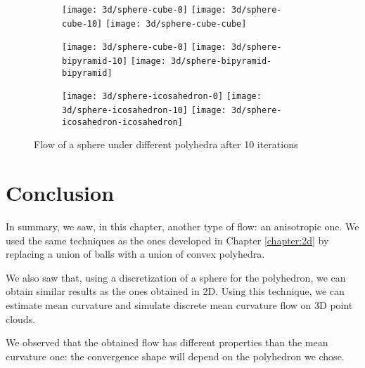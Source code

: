 \begin{figure}[h]
    \centering
    \begin{subfigure}[b]{\textwidth}
        \centering
        \texttt{[image: 3d/sphere-cube-0]}
        \texttt{[image: 3d/sphere-cube-10]}
        \texttt{[image: 3d/sphere-cube-cube]}
    \end{subfigure}

    \begin{subfigure}[b]{\textwidth}
        \centering
        \texttt{[image: 3d/sphere-cube-0]}
        \texttt{[image: 3d/sphere-bipyramid-10]}
        \texttt{[image: 3d/sphere-bipyramid-bipyramid]}
    \end{subfigure}

    \begin{subfigure}[b]{\textwidth}
        \centering
        \texttt{[image: 3d/sphere-icosahedron-0]}
        \texttt{[image: 3d/sphere-icosahedron-10]}
        \texttt{[image: 3d/sphere-icosahedron-icosahedron]}
    \end{subfigure}

    \caption{Flow of a sphere under different polyhedra after 10 iterations}
    \label{fig:3d-flow-sphere}
\end{figure}

\section{Conclusion}

In summary, we saw, in this chapter, another type of flow: an anisotropic one.
We used the same techniques as the ones developed in Chapter \ref{chapter:2d} by
replacing a union of balls with a union of convex polyhedra.

We also saw that, using a discretization of a sphere for the polyhedron, we can
obtain similar results as the ones obtained in 2D. Using this technique, we can
estimate mean curvature and simulate discrete mean curvature flow on 3D point
clouds.

We observed that the obtained flow has different properties than the mean
curvature one: the convergence shape will depend on the polyhedron we chose.

